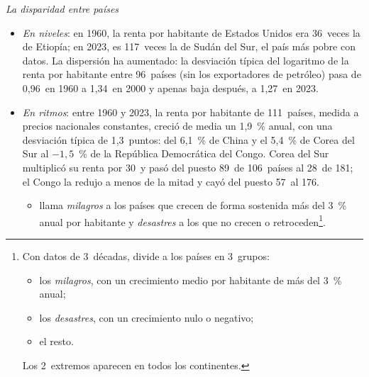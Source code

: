 \documentclass[11pt]{article}
\begin{document}
\begin{anotaciones}
\emph{La disparidad entre países}
\begin{itemize}
\item \emph{En niveles}: en 1960, la renta por habitante de Estados Unidos era 36~veces la de Etiopía; en 2023, es 117~veces la de Sudán del Sur, el país más pobre con datos. La dispersión ha aumentado: la desviación típica del logaritmo de la renta por habitante entre 96~países (sin los exportadores de petróleo) pasa de 0,96~en 1960 a 1,34~en 2000 y apenas baja después, a 1,27~en 2023\nocite{GGDC2025PWT}.
\item \emph{En ritmos}: entre 1960 y 2023, la renta por habitante de 111~países, medida a precios nacionales constantes, creció de media un 1,9~\% anual, con una desviación típica de 1,3~puntos: del 6,1~\% de China y el 5,4~\% de Corea del Sur al $-1{,}5$~\% de la República Democrática del Congo. Corea del Sur multiplicó su renta por 30~y pasó del puesto 89~de 106~países al 28~de 181; el Congo la redujo a menos de la mitad y cayó del puesto 57~al 176\nocite{GGDC2025PWT}.
  \begin{itemize}
  \item \textcite{Panagariya2004} llama \emph{milagros} a los países que crecen de forma sostenida más del 3~\% anual por habitante y \emph{desastres} a los que no crecen o retroceden\footnote{Con datos de 3~décadas, \textcite{Panagariya2004} divide a los países en 3~grupos:
\begin{itemize}
\item los \emph{milagros}, con un crecimiento medio por habitante de más del 3~\% anual;
\item los \emph{desastres}, con un crecimiento nulo o negativo;
\item el resto.
\end{itemize}
Los 2~extremos aparecen en todos los continentes.}.
  \end{itemize}

\end{itemize}
\end{anotaciones}
\end{document}

